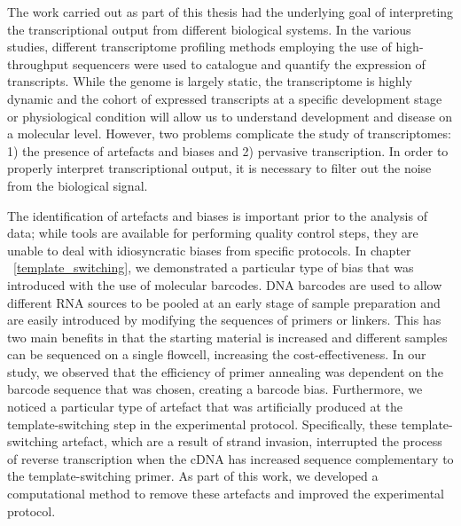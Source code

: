 The work carried out as part of this thesis had the underlying goal of interpreting the transcriptional output from different biological systems. In the various studies, different transcriptome profiling methods employing the use of high-throughput sequencers were used to catalogue and quantify the expression of transcripts. While the genome is largely static, the transcriptome is highly dynamic and the cohort of expressed transcripts at a specific development stage or physiological condition will allow us to understand development and disease on a molecular level. However, two problems complicate the study of transcriptomes: 1) the presence of artefacts and biases and 2) pervasive transcription. In order to properly interpret transcriptional output, it is necessary to filter out the noise from the biological signal.

The identification of artefacts and biases is important prior to the analysis of data; while tools\cite{pmid19737799, fastqc} are available for performing quality control steps, they are unable to deal with idiosyncratic biases from specific protocols. In chapter ~\ref{template_switching}, we demonstrated a particular type of bias that was introduced with the use of molecular barcodes. DNA barcodes are used to allow different RNA sources to be pooled at an early stage of sample preparation and are easily introduced by modifying the sequences of primers or linkers. This has two main benefits in that the starting material is increased and different samples can be sequenced on a single flowcell, increasing the cost-effectiveness. In our study, we observed that the efficiency of primer annealing was dependent on the barcode sequence that was chosen\cite{Tang01022013}, creating a barcode bias. Furthermore, we noticed a particular type of artefact that was artificially produced at the template-switching step in the experimental protocol\cite{Tang01022013}. Specifically, these template-switching artefact, which are a result of strand invasion, interrupted the process of reverse transcription when the cDNA has increased sequence complementary to the template-switching primer. As part of this work, we developed a computational method to remove these artefacts and improved the experimental protocol.

